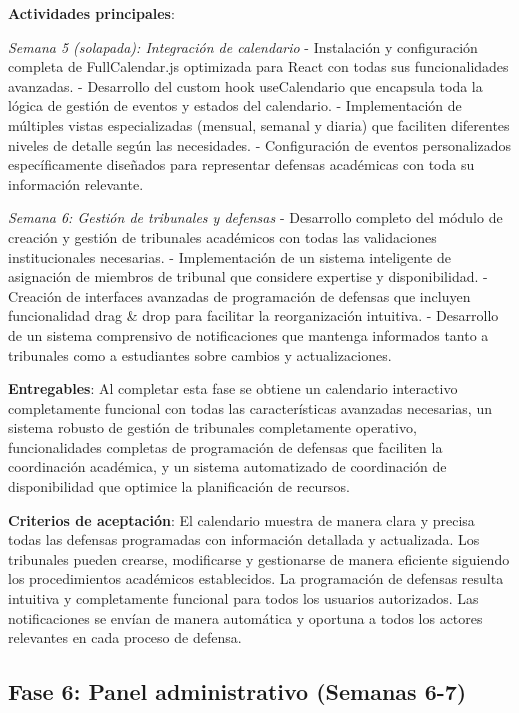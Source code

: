 \documentclass[12pt,a4paper,oneside]{report}
\begin{document}
\textbf{Actividades principales}:

\emph{Semana 5 (solapada): Integración de calendario} - Instalación y configuración completa de FullCalendar.js optimizada para React con todas sus funcionalidades avanzadas. - Desarrollo del custom hook useCalendario que encapsula toda la lógica de gestión de eventos y estados del calendario. - Implementación de múltiples vistas especializadas (mensual, semanal y diaria) que faciliten diferentes niveles de detalle según las necesidades. - Configuración de eventos personalizados específicamente diseñados para representar defensas académicas con toda su información relevante.

\emph{Semana 6: Gestión de tribunales y defensas} - Desarrollo completo del módulo de creación y gestión de tribunales académicos con todas las validaciones institucionales necesarias. - Implementación de un sistema inteligente de asignación de miembros de tribunal que considere expertise y disponibilidad. - Creación de interfaces avanzadas de programación de defensas que incluyen funcionalidad drag & drop para facilitar la reorganización intuitiva. - Desarrollo de un sistema comprensivo de notificaciones que mantenga informados tanto a tribunales como a estudiantes sobre cambios y actualizaciones.

\textbf{Entregables}: Al completar esta fase se obtiene un calendario interactivo completamente funcional con todas las características avanzadas necesarias, un sistema robusto de gestión de tribunales completamente operativo, funcionalidades completas de programación de defensas que faciliten la coordinación académica, y un sistema automatizado de coordinación de disponibilidad que optimice la planificación de recursos.

\textbf{Criterios de aceptación}: El calendario muestra de manera clara y precisa todas las defensas programadas con información detallada y actualizada. Los tribunales pueden crearse, modificarse y gestionarse de manera eficiente siguiendo los procedimientos académicos establecidos. La programación de defensas resulta intuitiva y completamente funcional para todos los usuarios autorizados. Las notificaciones se envían de manera automática y oportuna a todos los actores relevantes en cada proceso de defensa.

\subsection{Fase 6: Panel administrativo (Semanas
6-7)}\label{fase-6-panel-administrativo-semanas-6-7}
\end{document}
